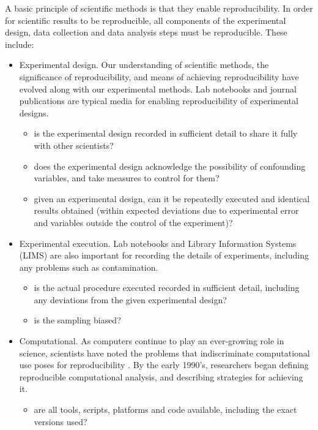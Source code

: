 A basic principle of scientific methods is that they enable reproducibility.  
In order for scientific results to be reproducible, all components of the 
experimental design, data collection and data analysis steps must be 
reproducible.  These include:
\begin{itemize}
 \item Experimental design.  Our understanding of scientific methods, the 
 significance of reproducibility, and means of achieving reproducibility 
 have evolved along with our experimental methods.  Lab notebooks and journal 
 publications are typical media for enabling reproducibility of experimental 
 designs.  
  \begin{itemize}
     \item is the experimental design recorded in sufficient detail to share 
     it fully with other scientists?
     \item does the experimental design acknowledge the possibility of 
     confounding variables, and take measures to control for them?
     \item given an experimental design, can it be repeatedly executed and 
     identical results obtained (within expected deviations due to experimental 
     error and variables outside the control of the experiment)?
  \end{itemize}
 \item Experimental execution.  Lab notebooks and Library Information Systems 
 (LIMS) are also important for recording the details of experiments, including 
 any problems such as contamination.
  \begin{itemize}
     \item is the actual procedure executed recorded in sufficient detail, 
     including any deviations from the given experimental design?
     \item is the sampling biased?
  \end{itemize}
  \item Computational.  As computers continue to play an ever-growing role in 
  science, scientists have noted the problems that indiscriminate computational 
  use poses for reproducibility \cite{donoho_wavelab, peng2011reproducible}.  
  By the early 
  1990's, researchers began defining reproducible computational analysis, and 
  describing strategies for achieving it. 
  \begin{itemize}
     \item are all tools, scripts, platforms and code available, including the 
     exact versions used?

\end{itemize}
\end{itemize}
